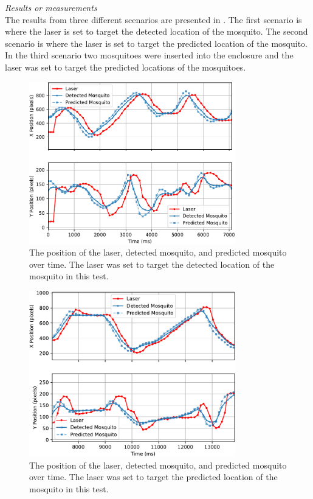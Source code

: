 \textit{Results or measurements}\\
The results from three different scenarios are presented in . The first scenario is where the laser is set to target the detected location of the mosquito. The second scenario is where the laser is set to target the predicted location of the mosquito. In the third scenario two mosquitoes were inserted into the enclosure and the laser was set to target the predicted locations of the mosquitoes.
\begin{figure}[!htb]
  \centering
  \includegraphics[width=0.8\textwidth]{figures/results/q1_1mos_detection_10fps.pdf}
  \caption{The position of the laser, detected mosquito, and predicted mosquito over time. The laser was set to target the detected location of the mosquito in this test.}
  \label{fig:q1_1mos_detection_10fps}
\end{figure}
\begin{figure}[!htb]
  \centering
  \includegraphics[width=0.8\textwidth]{figures/results/q1_1mos_prediction_10fps.pdf}
  \caption{The position of the laser, detected mosquito, and predicted mosquito over time. The laser was set to target the predicted location of the mosquito in this test.}
  \label{fig:q1_1mos_prediction_10fps}
\end{figure}
